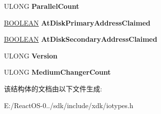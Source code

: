 \begin{DoxyCompactItemize}
\item 
\mbox{\label{struct___c_o_n_f_i_g_u_r_a_t_i_o_n___i_n_f_o_r_m_a_t_i_o_n_aaff1ac2cf87589e2fec67b8e71e29181}} 
U\+L\+O\+NG {\bfseries Parallel\+Count}
\item 
\mbox{\label{struct___c_o_n_f_i_g_u_r_a_t_i_o_n___i_n_f_o_r_m_a_t_i_o_n_a4aa9e71c5f85db06b82b9879f7eda16a}} 
\hyperlink{_processor_bind_8h_a112e3146cb38b6ee95e64d85842e380a}{B\+O\+O\+L\+E\+AN} {\bfseries At\+Disk\+Primary\+Address\+Claimed}
\item 
\mbox{\label{struct___c_o_n_f_i_g_u_r_a_t_i_o_n___i_n_f_o_r_m_a_t_i_o_n_adc8db1dbb970ae859959e7fb4ba73191}} 
\hyperlink{_processor_bind_8h_a112e3146cb38b6ee95e64d85842e380a}{B\+O\+O\+L\+E\+AN} {\bfseries At\+Disk\+Secondary\+Address\+Claimed}
\item 
\mbox{\label{struct___c_o_n_f_i_g_u_r_a_t_i_o_n___i_n_f_o_r_m_a_t_i_o_n_a034eecf9fbeb87b60354dc5cde0156cc}} 
U\+L\+O\+NG {\bfseries Version}
\item 
\mbox{\label{struct___c_o_n_f_i_g_u_r_a_t_i_o_n___i_n_f_o_r_m_a_t_i_o_n_af19453bf05bbdbc1ecc9c796acd8ecc9}} 
U\+L\+O\+NG {\bfseries Medium\+Changer\+Count}
\end{DoxyCompactItemize}


该结构体的文档由以下文件生成\+:\begin{DoxyCompactItemize}
\item 
E\+:/\+React\+O\+S-\/0../sdk/include/xdk/iotypes.\+h\end{DoxyCompactItemize}
